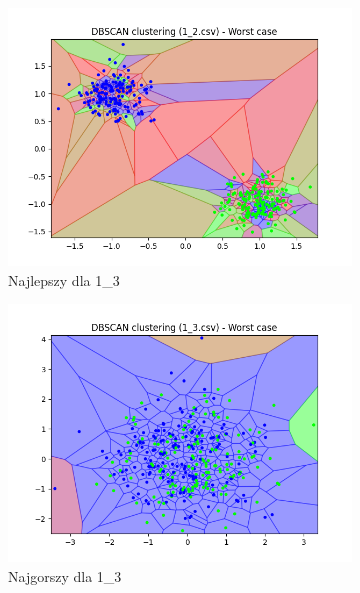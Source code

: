 \documentclass[12pt]{article}
\begin{document}
\begin{figure}[H]
\begin{subfigure}[b]{0.24\textwidth}
        \includegraphics[width=\linewidth]{img/exp_2/dbscan/1_2_worst.png}
        \caption{Najlepszy dla 1\_3}
    \end{subfigure}
    \hfill
    \begin{subfigure}[b]{0.24\textwidth}
        \includegraphics[width=\linewidth]{img/exp_2/dbscan/1_3_worst.png}
        \caption{Najgorszy dla 1\_3}
    \end{subfigure}
    \hfill
    \begin{subfigure}[b]{0.24\textwidth}

\end{subfigure}
\end{figure}
\end{document}
